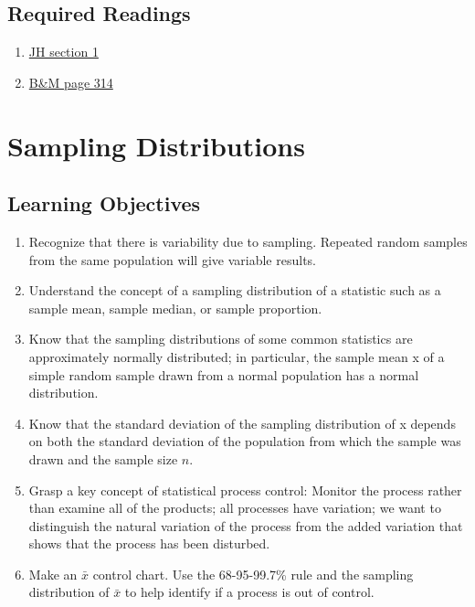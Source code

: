 \documentclass[letterpaper,9pt,twocolumn,twoside,printwatermark=false]{pinp}
\providecommand{\tightlist}{%
  \setlength{\itemsep}{0pt}\setlength{\parskip}{0pt}}
\begin{document}
\subsection{Required Readings}\label{required-readings}

\begin{enumerate}
\def\labelenumi{\arabic{enumi}.}
\tightlist
\item
  \href{https://www.dropbox.com/s/kr293cablb11nrm/Ch13SamplingDistributionsJH2018.pdf?dl=0}{JH
  section 1}
\item
  \href{https://www.dropbox.com/s/8u0j9lupv5pxqpm/Ch13SamplingDistributions.pdf?dl=0}{B\&M
  page 314}
\end{enumerate}

\vspace*{0.25cm}

\section{Sampling Distributions}\label{sampling-distributions}

\subsection{Learning Objectives}\label{learning-objectives-1}

\begin{enumerate}
\def\labelenumi{\arabic{enumi}.}
\tightlist
\item
  Recognize that there is variability due to sampling. Repeated random
  samples from the same population will give variable results.
\item
  Understand the concept of a sampling distribution of a statistic such
  as a sample mean, sample median, or sample proportion.
\item
  Know that the sampling distributions of some common statistics are
  approximately normally distributed; in particular, the sample mean x
  of a simple random sample drawn from a normal population has a normal
  distribution.
\item
  Know that the standard deviation of the sampling distribution of x
  depends on both the standard deviation of the population from which
  the sample was drawn and the sample size \(n\).
\item
  Grasp a key concept of statistical process control: Monitor the
  process rather than examine all of the products; all processes have
  variation; we want to distinguish the natural variation of the process
  from the added variation that shows that the process has been
  disturbed.
\item
  Make an \(\bar{x}\) control chart. Use the 68-95-99.7\% rule and the
  sampling distribution of \(\bar{x}\) to help identify if a process is
  out of control.
\end{enumerate}
\end{document}
